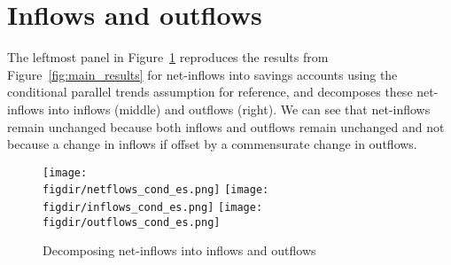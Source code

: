 \section{Inflows and outflows}%
\label{sec:inflows_and_outflows}

The leftmost panel in Figure~\ref{fig:in_out_results} reproduces the results from
Figure~\ref{fig:main_results} for net-inflows into savings accounts using the
conditional parallel trends assumption for reference, and decomposes these
net-inflows into inflows (middle) and outflows (right). We can see that
net-inflows remain unchanged because both inflows and outflows remain
unchanged and not because a change in inflows if offset by a commensurate
change in outflows.

\begin{figure}[H]
    \centering
    \caption{Decomposing net-inflows into inflows and outflows}%
    \label{fig:in_out_results}
    \texttt{[image: \\figdir/netflows\_cond\_es.png]}
    \texttt{[image: \\figdir/inflows\_cond\_es.png]}
    \texttt{[image: \\figdir/outflows\_cond\_es.png]}
\end{figure}

